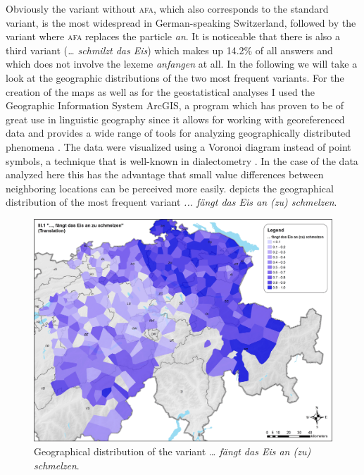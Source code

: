 \documentclass[output=paper]{LSP/langsci}
\begin{document}
Obviously the variant without \textsc{afa}, which also corresponds to the standard variant, is the most widespread in German-speaking Switzerland, followed by the variant where \textsc{afa }replaces the particle \emph{an}. It is noticeable that there is also a third variant (\emph{… schmilzt das Eis}) which makes up 14.2\% of all answers and which does not involve the lexeme \emph{anfangen} at all. In the following we will take a look at the geographic distributions of the two most frequent variants. For the creation of the maps as well as for the geostatistical analyses I used the Geographic Information System ArcGIS, a program which has proven to be of great use in linguistic geography since it allows for working with georeferenced data and provides a wide range of tools for analyzing geographically distributed phenomena \citep{montgomery_geographic_2013,stoeckle_subjektive_2014}. The data were visualized using a Voronoi diagram instead of point symbols, a technique that is well-known in dialectometry \citep{goebl_dialectometry_2010,nerbonne_mapping_2010}. In the case of the data analyzed here this has the advantage that small value differences between neighboring locations can be perceived more easily.  depicts the geographical distribution of the most frequent variant \emph{... fängt das Eis an (zu) schmelzen}.

\begin{figure}
\includegraphics[width=\textwidth]{illustrations/stoeck_fig1}
\caption{Geographical distribution of the variant \emph{… fängt das Eis an (zu) schmelzen}.}
\label{fig:stoeck:1}
\end{figure}
\end{document}

